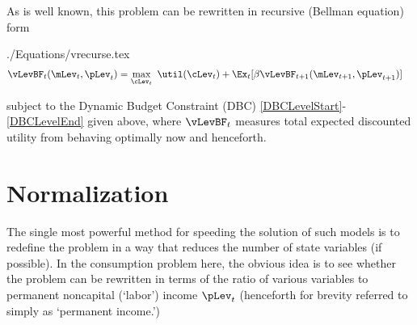 \documentclass[titlepage]{\econtex}
\begin{document}
As is well known, this problem can be rewritten in recursive (Bellman equation) form
\begin{verbatimwrite}{./Equations/vrecurse.tex}
  \begin{equation}\begin{gathered}\begin{aligned}
    \vLevBF_{t}(\mLev_{t},\pLev_{t})  & = \max_{\cLev_{t}}~ \util(\cLev_{t}) + \Ex_{t}[{\DiscAlt} \vLevBF_{t+1}({\mLev}_{t+1},\pLev_{t+1})]\label{eq:vrecurse}
  \end{aligned}\end{gathered}\end{equation}
\end{verbatimwrite}

subject to the Dynamic Budget Constraint (DBC) \eqref{DBCLevelStart}-\eqref{DBCLevelEnd} given above, where $\vLevBF_{t}$
measures total expected discounted utility from behaving optimally now
and henceforth.%

\hypertarget{Normalization}{}
\section{Normalization}\label{sec:normalization}
 The single most powerful method for speeding
the solution of such models is to redefine
the problem in a way that reduces the number of state variables (if
possible).  In the consumption problem here, the obvious idea is to see 
whether the problem can be rewritten in terms of the ratio of various
variables to permanent noncapital (`labor') income $\pLev_{t}$ (henceforth
for brevity referred to simply as `permanent income.')
\end{document}
